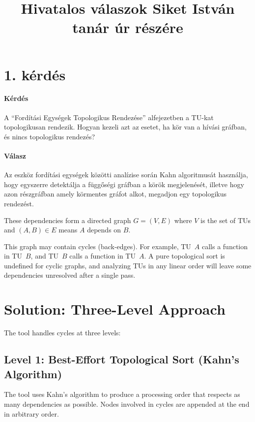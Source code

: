 \documentclass[11pt]{article}
\title{Hivatalos válaszok Siket István tanár úr részére}
\author{}
\date{}
\begin{document}
\maketitle

\section{1. kérdés}

\paragraph {Kérdés}
A “Fordítási Egységek Topologikus Rendezése” alfejezetben a TU-kat topologikusan rendezik. Hogyan kezeli azt az esetet, ha kör van a hívási gráfban, és nincs topologikus rendezés?

\paragraph {Válasz}

Az eszköz fordítási egységek közötti analízise során Kahn algoritmusát \cite{Kahn1962} használja, hogy egyszerre detektálja a függőségi gráfban a körök megjelenését, illetve hogy azon részgráfban amely körmentes gráfot alkot, megadjon egy topologikus rendezést.

These dependencies form a directed graph $G = (V, E)$ where $V$ is the set of TUs and $(A, B) \in E$ means $A$ depends on $B$.

This graph may contain cycles (back-edges). For example, TU~$A$ calls a function in TU~$B$, and TU~$B$ calls a function in TU~$A$. A pure topological sort is undefined for cyclic graphs, and analyzing TUs in any linear order will leave some dependencies unresolved after a single pass.

\section{Solution: Three-Level Approach}

The tool handles cycles at three levels:

\subsection{Level 1: Best-Effort Topological Sort (Kahn's Algorithm)}

The tool uses Kahn's algorithm to produce a processing order that respects as many dependencies as possible. Nodes involved in cycles are appended at the end in arbitrary order.
\end{document}
